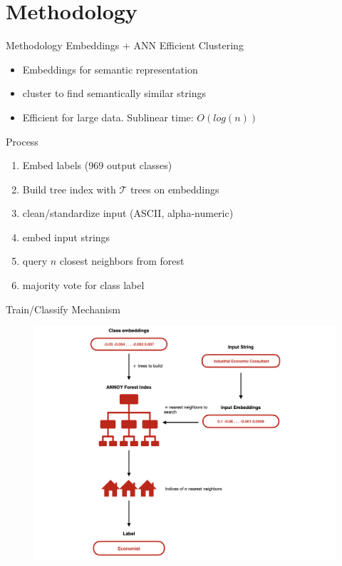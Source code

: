 \documentclass{beamer}
\newcommand\Tau{\mathcal{T}}
\begin{document}
\section{Methodology}


\begin{frame}{Methodology}
Embeddings + ANN Efficient Clustering
\begin{itemize}
    \item Embeddings for semantic representation
    \item cluster to find semantically similar strings
    \item Efficient for large data. Sublinear time: $O(log(n))$
\end{itemize}
\end{frame}


\begin{frame}{Process}
    \begin{enumerate}
        \item Embed labels (969 output classes)
        \item Build tree index with $ \Tau$ trees on embeddings 
        \item clean/standardize input (ASCII, alpha-numeric)
        \item embed input strings 
        \item query $n$ closest neighbors from forest
        \item majority vote for class label
    \end{enumerate}
\end{frame}




\begin{frame}{Train/Classify Mechanism}

    \begin{figure}
       \centering
        \includegraphics[width=.75\linewidth]{images/pipe.jpeg}
        \label{fig:pipe}
    \end{figure}
    \hfill
\end{frame}
\end{document}
